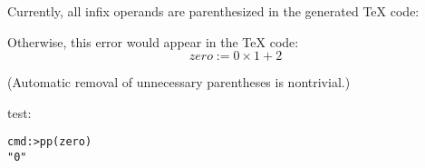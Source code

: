 \documentclass{../lib}
\begin{document}
\begin{ledCmnt}
Currently, all infix operands are parenthesized in the generated \TeX{} code:
\end{ledCmnt}

\begin{ledDef}
\end{ledDef}

\begin{ledCmnt}
Otherwise, this error would appear in the \TeX{} code:
$$ zero := 0 \times 1 + 2 $$

(Automatic removal of unnecessary parentheses is nontrivial.)

test:
\begin{verbatim}
cmd:>pp(zero)
"0"
\end{verbatim}
\end{ledCmnt}
\end{document}
